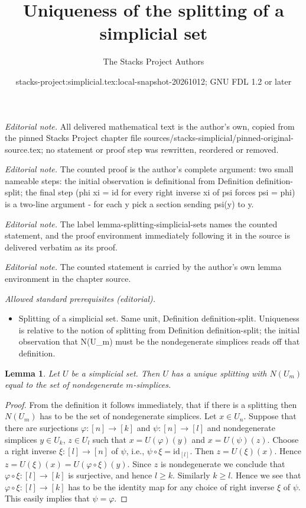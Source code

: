 \documentclass{stacks-project}
\title{Uniqueness of the splitting of a simplicial set}
\author{The Stacks Project Authors}
\date{stacks-project:simplicial.tex:local-snapshot-20261012; GNU FDL 1.2 or later}
\theoremstyle{plain}
\newtheorem{lemma}[subsection]{Lemma}
\theoremstyle{definition}
\theoremstyle{remark}
\numberwithin{equation}{subsection}
\begin{document}
\maketitle
\noindent\textit{Editorial note.} All delivered mathematical text is the author's own, copied from the pinned Stacks Project chapter file sources/stacks-simplicial/pinned-original-source.tex; no statement or proof step was rewritten, reordered or removed.\par\medskip
\noindent\textit{Editorial note.} The counted proof is the author's complete argument: two small nameable steps: the initial observation is definitional from Definition definition-split; the final step (phi xi = id for every right inverse xi of psi forces psi = phi) is a two-line argument - for each y pick a section sending psi(y) to y.\par\medskip
\noindent\textit{Editorial note.} The label lemma-splitting-simplicial-sets names the counted statement, and the proof environment immediately following it in the source is delivered verbatim as its proof.\par\medskip
\noindent\textit{Editorial note.} The counted statement is carried by the author's own lemma environment in the chapter source.\par\medskip
\noindent\textit{Allowed standard prerequisites (editorial).}\begin{itemize}
\item Splitting of a simplicial set. Same unit, Definition definition-split. Uniqueness is relative to the notion of splitting from Definition definition-split; the initial observation that N(U\_m) must be the nondegenerate simplices reads off that definition.
\end{itemize}\medskip
\begin{lemma}
\label{lemma-splitting-simplicial-sets}
Let $U$ be a simplicial set. Then $U$ has a unique splitting
with $N(U_m)$ equal to the set of nondegenerate $m$-simplices.
\end{lemma}

\begin{proof}
From the definition it follows immediately, that if there is a
splitting then $N(U_m)$ has to be the set of nondegenerate simplices.
Let $x \in U_n$. Suppose that there are surjections $\varphi : [n] \to [k]$
and $\psi : [n] \to [l]$ and nondegenerate simplices
$y \in U_k$, $z \in U_l$ such that $x = U(\varphi)(y)$
and $x = U(\psi)(z)$. Choose a right inverse $\xi : [l] \to [n]$
of $\psi$, i.e., $\psi \circ \xi = \text{id}_{[l]}$.
Then $z = U(\xi)(x)$. Hence $z = U(\xi)(x) = U(\varphi \circ \xi)(y)$.
Since $z$ is nondegenerate we conclude that $\varphi \circ \xi :
[l] \to [k]$ is surjective, and hence $l \geq k$. Similarly
$k \geq l$. Hence we see that $\varphi \circ \xi : [l] \to [k]$
has to be the identity map for any choice of right inverse
$\xi$ of $\psi$. This easily implies that $\psi = \varphi$.
\end{proof}
\end{document}
